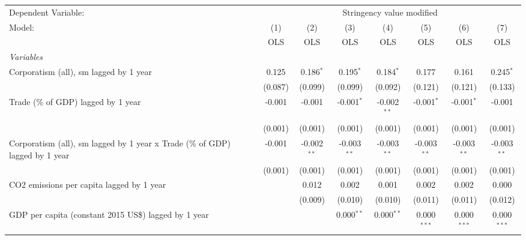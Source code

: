 
\begingroup
\centering
\begin{tabular}{lccccccc}
   \toprule
   Dependent Variable: & \multicolumn{7}{c}{Stringency value modified}\\
   Model:                                                                       & (1)     & (2)           & (3)           & (4)           & (5)           & (6)           & (7)\\  
                                                                                &  OLS    & OLS           & OLS           & OLS           & OLS           & OLS           & OLS\\  
   \midrule
   \emph{Variables}\\
   Corporatism (all), sm lagged by 1 year                                       & 0.125   & 0.186$^{*}$   & 0.195$^{*}$   & 0.184$^{*}$   & 0.177         & 0.161         & 0.245$^{*}$\\   
                                                                                & (0.087) & (0.099)       & (0.099)       & (0.092)       & (0.121)       & (0.121)       & (0.133)\\   
   Trade (\% of GDP) lagged by 1 year                                           & -0.001  & -0.001        & -0.001$^{*}$  & -0.002$^{**}$ & -0.001$^{*}$  & -0.001$^{*}$  & -0.001\\   
                                                                                & (0.001) & (0.001)       & (0.001)       & (0.001)       & (0.001)       & (0.001)       & (0.001)\\   
   Corporatism (all), sm lagged by 1 year x Trade (\% of GDP) lagged by 1 year  & -0.001  & -0.002$^{**}$ & -0.003$^{**}$ & -0.003$^{**}$ & -0.003$^{**}$ & -0.003$^{**}$ & -0.003$^{**}$\\   
                                                                                & (0.001) & (0.001)       & (0.001)       & (0.001)       & (0.001)       & (0.001)       & (0.001)\\   
   CO2 emissions per capita lagged by 1 year                                    &         & 0.012         & 0.002         & 0.001         & 0.002         & 0.002         & 0.000\\   
                                                                                &         & (0.009)       & (0.010)       & (0.010)       & (0.011)       & (0.011)       & (0.012)\\   
   GDP per capita (constant 2015 US\$) lagged by 1 year                         &         &               & 0.000$^{**}$  & 0.000$^{**}$  & 0.000$^{***}$ & 0.000$^{***}$ & 0.000$^{***}$\\   

\end{tabular}
